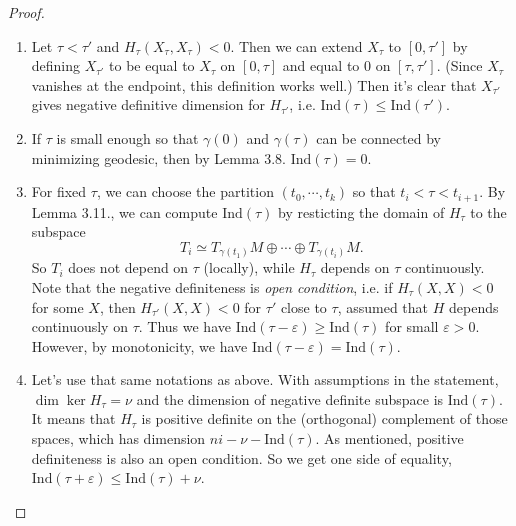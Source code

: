\documentclass{article}
\newcommand{\ep}{\varepsilon}
\newcommand{\g}{\gamma}
\newcommand{\Ind}{\mathrm{Ind}}
\begin{document}
		\begin{proof}
		\begin{enumerate}
		\item Let $\tau<\tau'$ and $H_\tau(X_\tau,X_\tau)<0$.
		Then we can extend $X_\tau$ to $[0,\tau']$ by defining $X_{\tau'}$ to be equal to $X_\tau$ on $[0,\tau]$ and equal to 0 on $[\tau,\tau']$.
		(Since $X_\tau$ vanishes at the endpoint, this definition works well.)
		Then it's clear that $X_{\tau'}$ gives negative definitive dimension for $H_{\tau'}$, i.e. $\Ind(\tau)\leq\Ind(\tau')$.
		\item If $\tau$ is small enough so that $\g(0)$ and $\g(\tau)$ can be connected by minimizing geodesic, then by Lemma 3.8. $\Ind(\tau)=0$.
		\item For fixed $\tau$, we can choose the partition $(t_0,\cdots,t_k)$ so that $t_i<\tau<t_{i+1}$.
		By Lemma 3.11., we can compute $\Ind(\tau)$ by resticting the domain of $H_\tau$ to the subspace
			$$T_i\simeq T_{\g(t_1)}M\oplus\cdots\oplus T_{\g(t_i)}M.$$
		So $T_i$ does not depend on $\tau$ (locally), while $H_\tau$ depends on $\tau$ continuously.
		Note that the negative definiteness is \emph{open condition}, i.e. if $H_\tau(X,X)<0$ for some $X$, then $H_{\tau'}(X,X)<0$ for $\tau'$ close to $\tau$, assumed that $H$ depends continuously on $\tau$.
		Thus we have $\Ind(\tau-\ep)\geq\Ind(\tau)$ for small $\ep>0$.
		However, by monotonicity, we have $\Ind(\tau-\ep)=\Ind(\tau)$.
		\item Let's use that same notations as above.
		With assumptions in the statement, $\dim\ker H_\tau=\nu$ and the dimension of negative definite subspace is $\Ind(\tau)$.
		It means that $H_\tau$ is positive definite on the (orthogonal) complement of those spaces, which has dimension $ni-\nu-\Ind(\tau)$.
		As mentioned, positive definiteness is also an open condition.
		So we get one side of equality, $\Ind(\tau+\ep)\leq \Ind(\tau)+\nu$.
		

\end{enumerate}
\end{proof}
\end{document}
